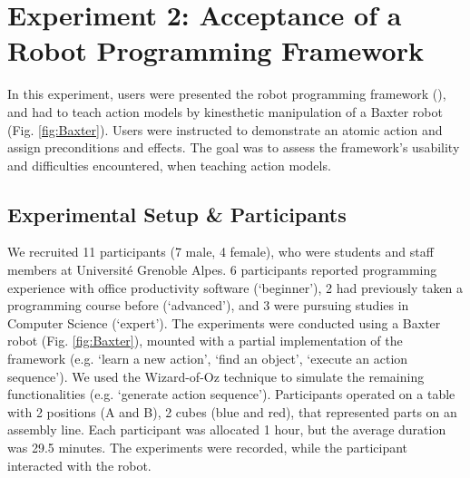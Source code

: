 \newpage
\section{Experiment 2: Acceptance of a Robot Programming Framework}

\label{sec:Exp2}

In this experiment, users were presented the robot programming framework (), and had to teach action models by kinesthetic manipulation of a Baxter robot (Fig. \ref{fig:Baxter}). Users were instructed to demonstrate an atomic action and assign preconditions and effects. The goal was to assess the framework's usability and difficulties encountered, when teaching action models.

\subsection{Experimental Setup \& Participants}
We recruited 11 participants (7 male, 4 female), who were students and staff members at Universit\'{e} Grenoble Alpes. 6 participants reported programming experience with office productivity software (`beginner'), 2 had previously taken a programming course before (`advanced'), and 3 were pursuing studies in Computer Science (`expert').
The experiments were conducted using a Baxter robot (Fig. \ref{fig:Baxter}), mounted with a partial implementation of the framework (e.g. `learn a new action', `find an object', `execute an action sequence'). We used the Wizard-of-Oz technique to simulate the remaining functionalities (e.g. `generate action sequence').
Participants operated on a table with 2 positions (A and B), 2 cubes (blue and red), that represented parts on an assembly line. 
Each participant was allocated 1 hour, but the average duration was 29.5 minutes. The experiments were recorded, while the participant interacted with the robot. 


